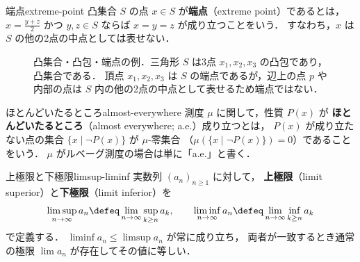 \begin{definition}{端点}{extreme-point}
  凸集合 $S$ の点 $x \in S$ が\textbf{端点}（extreme point）であるとは，
  $x = \frac{y + z}{2}$ かつ $y, z \in S$ ならば $x = y = z$ が成り立つことをいう．
  すなわち，$x$ は $S$ の他の2点の中点としては表せない．
\end{definition}

\begin{figure}[htbp]
  \centering
  \caption{凸集合・凸包・端点の例．三角形 $S$ は3点 $x_1, x_2, x_3$ の凸包であり，凸集合である．
  頂点 $x_1, x_2, x_3$ は $S$ の端点であるが，辺上の点 $p$ や内部の点は $S$ 内の他の2点の中点として表せるため端点ではない．}
  \label{fig:convex-hull-extreme}
\end{figure}

\begin{definition}{ほとんどいたるところ}{almost-everywhere}
  測度 $\mu$ に関して，性質 $P(x)$ が
  \textbf{ほとんどいたるところ}（almost everywhere; a.e.）成り立つとは，
  $P(x)$ が成り立たない点の集合 $\{x \mid \lnot P(x)\}$ が $\mu$-零集合
  （$\mu(\{x \mid \lnot P(x)\}) = 0$）であることをいう．
  $\mu$ がルベーグ測度の場合は単に「a.e.」と書く．
\end{definition}

\begin{definition}{上極限と下極限}{limsup-liminf}
  実数列 $(a_n)_{n \geq 1}$ に対して，
  \textbf{上極限}（limit superior）と\textbf{下極限}（limit inferior）を
  \[
    \limsup_{n \to \infty} a_n \defeq \lim_{n \to \infty} \sup_{k \geq n} a_k, \qquad
    \liminf_{n \to \infty} a_n \defeq \lim_{n \to \infty} \inf_{k \geq n} a_k
  \]
  で定義する．
  $\liminf a_n \leq \limsup a_n$ が常に成り立ち，
  両者が一致するとき通常の極限 $\lim a_n$ が存在してその値に等しい．
\end{definition}

